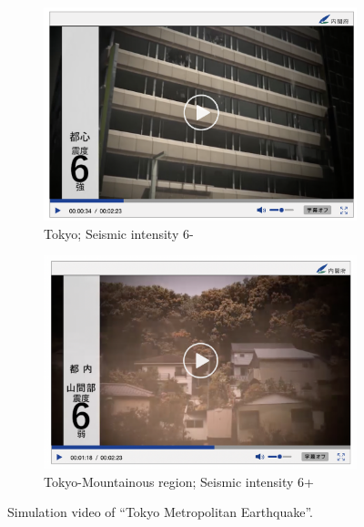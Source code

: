 \begin{figure}[h]
\begin{subfigure}{0.32\textwidth}
    \includegraphics[width=\linewidth]{Figure/Figure5f.jpg}
    \caption{Tokyo; Seismic intensity 6-}
    \label{fig5f}
  \end{subfigure}
  \begin{subfigure}{0.32\textwidth}
    \centering
    \includegraphics[width=\linewidth]{Figure/Figure5g.jpg}
    \caption{Tokyo-Mountainous region; Seismic intensity 6+}
    \label{fig5g}
  \end{subfigure}
  \centering
  \caption[Simulation video of “Tokyo Metropolitan Earthquake”.]{Simulation video of “Tokyo Metropolitan Earthquake”.\protect\footnotemark }
  \label{fig5}
\end{figure}
